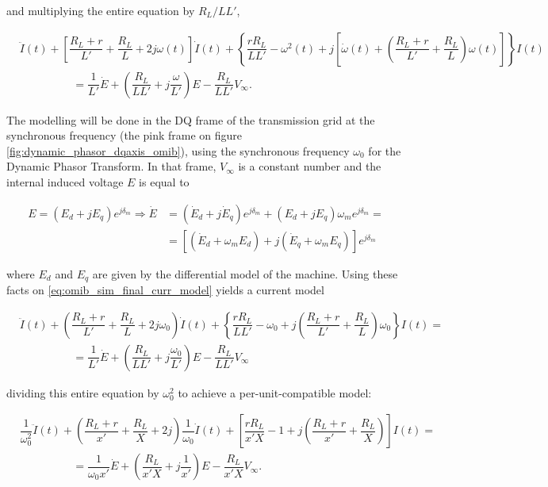 	\noindent and multiplying the entire equation by $R_L/LL'$,

\begin{align}
& \ddot{I}(t) + \left[\dfrac{R_L + r}{L'}+ \dfrac{R_L}{L} +  2j\omega(t)\right]\dot{I}(t) + \left\{ \dfrac{rR_L}{LL'} - \omega^2(t) + j\left[\dot{\omega}(t) + \left(\dfrac{R_L + r}{L'}+ \dfrac{R_L}{L}\right) \omega(t)\right]\right\} I(t) \nonumber\\[5mm]
%
& \hspace{2cm} = \dfrac{1}{L'}\dot{E} + \left(\dfrac{R_L}{LL'} + j\dfrac{\omega}{L'}\right)E - \dfrac{R_L}{LL'}V_\infty . \label{eq:omib_sim_final_curr_model}
\end{align}

	The modelling will be done in the DQ frame of the transmission grid at the synchronous frequency (the pink frame on figure \ref{fig:dynamic_phasor_dqaxis_omib}), using the synchronous frequency $\omega_0$ for the Dynamic Phasor Transform. In that frame, $V_\infty$ is a constant number and the internal induced voltage $E$ is equal to

\begin{align}
	E = \left(E_d + jE_q\right)e^{j\delta_m} \Rightarrow \dot{E} &= \left(\dot{E}_d + j\dot{E}_q\right)e^{j\delta_m} + \left(E_d + jE_q\right)\omega_m e^{j\delta_m} = \nonumber\\[5mm] &= \left[\left(\dot{E}_d + \omega_m E_d\right) + j\left(\dot{E}_q + \omega_m E_q\right)\right]e^{j\delta_m}
\end{align}

	\noindent where $E_d$ and $E_q$ are given by the differential model of the machine. Using these facts on \eqref{eq:omib_sim_final_curr_model} yields a current model

\begin{align}
& \ddot{I}(t) + \left(\dfrac{R_L + r}{L'}+ \dfrac{R_L}{L} +  2j\omega_0\right)\dot{I}(t) + \left\{ \dfrac{rR_L}{LL'} - \omega_0 + j\left(\dfrac{R_L + r}{L'}+ \dfrac{R_L}{L}\right) \omega_0 \right\} I(t) = \nonumber\\[5mm]
%
& \hspace{2cm} = \dfrac{1}{L'}\dot{E} + \left(\dfrac{R_L}{LL'} + j\dfrac{\omega_0}{L'}\right)E - \dfrac{R_L}{LL'}V_\infty
\end{align}

	\noindent dividing this entire equation by $\omega_0^2$ to achieve a per-unit-compatible model:

\begin{align}
& \dfrac{1}{\omega_0^2} \ddot{I}(t) + \left(\dfrac{R_L + r}{x'}+ \dfrac{R_L}{X} +  2j\right)\dfrac{1}{\omega_0}\dot{I}(t) + \left[ \dfrac{rR_L}{x'X} - 1 + j\left(\dfrac{R_L + r}{x'}+ \dfrac{R_L}{X}\right) \right] I(t) = \nonumber\\[5mm]
%
& \hspace{2cm} = \dfrac{1}{\omega_0 x'} \dot{E} + \left(\dfrac{R_L}{x'X} + j\dfrac{1}{x'}\right)E - \dfrac{R_L}{x'X}V_\infty. \label{eq:omib_current_final_pu_model}
\end{align}

